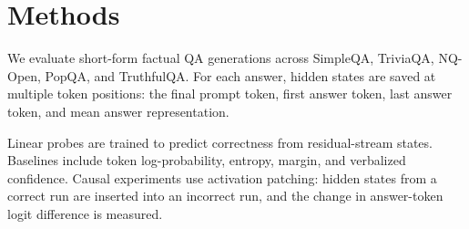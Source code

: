 \section{Methods}

We evaluate short-form factual QA generations across SimpleQA, TriviaQA,
NQ-Open, PopQA, and TruthfulQA. For each answer, hidden states are saved at
multiple token positions: the final prompt token, first answer token, last answer
token, and mean answer representation.

Linear probes are trained to predict correctness from residual-stream states.
Baselines include token log-probability, entropy, margin, and verbalized
confidence. Causal experiments use activation patching: hidden states from a
correct run are inserted into an incorrect run, and the change in answer-token
logit difference is measured.
